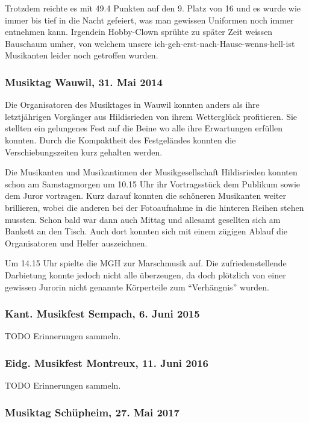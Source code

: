\begin{history}
    Trotzdem reichte es mit 49.4 Punkten auf den 9. Platz von 16 und es wurde
    wie immer bis tief in die Nacht gefeiert, was man gewissen Uniformen noch
    immer entnehmen kann. Irgendein Hobby-Clown sprühte zu später Zeit weissen
    Bauschaum umher, von welchem unsere ich-geh-erst-nach-Hause-wenns-hell-ist
    Musikanten leider noch getroffen wurden.


    \subsubsection*{Musiktag Wauwil, 31. Mai 2014}

    Die Organisatoren des Musiktages in Wauwil konnten anders als ihre
    letztjährigen  Vorgänger aus Hildisrieden von ihrem Wetterglück profitieren.
    Sie stellten ein gelungenes Fest auf die Beine wo alle ihre Erwartungen
    erfüllen konnten. Durch die Kompaktheit des Festgeländes konnten die
    Verschiebungszeiten kurz gehalten werden.

    Die Musikanten und Musikantinnen der Musikgesellschaft Hildisrieden konnten
    schon am Samstagmorgen um 10.15 Uhr ihr Vortragsstück dem Publikum sowie dem
    Juror vortragen. Kurz darauf konnten die schöneren Musikanten weiter
    brillieren, wobei die anderen bei der Fotoaufnahme in die hinteren Reihen
    stehen mussten. Schon bald war dann auch Mittag und allesamt gesellten sich
    am Bankett an den Tisch. Auch dort konnten sich mit einem zügigen Ablauf die
    Organisatoren und Helfer auszeichnen.

    Um 14.15 Uhr spielte die MGH zur Marschmusik auf. Die zufriedenstellende
    Darbietung konnte jedoch nicht alle überzeugen, da doch plötzlich von einer
    gewissen Jurorin nicht genannte Körperteile zum \enquote{Verhängnis} wurden.


    \subsubsection*{Kant. Musikfest Sempach, 6. Juni 2015}

    TODO Erinnerungen sammeln.


    \subsubsection*{Eidg. Musikfest Montreux, 11. Juni 2016}

    TODO Erinnerungen sammeln.


    \subsubsection*{Musiktag Schüpheim, 27. Mai 2017}


\end{history}
